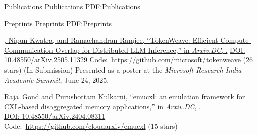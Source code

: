 \Section
{Publications}
{Publications}
{PDF:Publications}

\SubSection
{Preprints}
{Preprints}
{PDF:Preprints}

\begingroup
\renewcommand{\MaxNumberedItem}{[2]}

\BigGap
\NumberedItem{[2]}
\href{https://arxiv.org/abs/2505.11329}
{\underline{}, Nipun Kwatra, and Ramachandran Ramjee,
``TokenWeave: Efficient Compute-Communication Overlap for Distributed LLM Inference,''
in \textit{Arxiv.DC}, .} \newline
\href{https://doi.org/10.48550/arXiv.2505.11329}{DOI: 10.48550/arXiv.2505.11329} \newline Code:~\url{https://github.com/microsoft/tokenweave} (26 stars) (In Submission) \newline
Presented as a poster at the \textit{Microsoft Research India Academic Summit}, June 24, 2025.

\Gap
\NumberedItem{[1]}
\href{https://arxiv.org/abs/2404.08311}
{\underline{Raja~Gond} and Purushottam Kulkarni,
``emucxl: an emulation framework for CXL-based disaggregated memory applications,''
in \textit{Arxiv.DC},
.}\\
\href{https://doi.org/10.48550/arXiv.2404.08311}{DOI: 10.48550/arXiv.2404.08311} \\Code:~\url{https://github.com/cloudarxiv/emucxl} (15 stars)

\endgroup